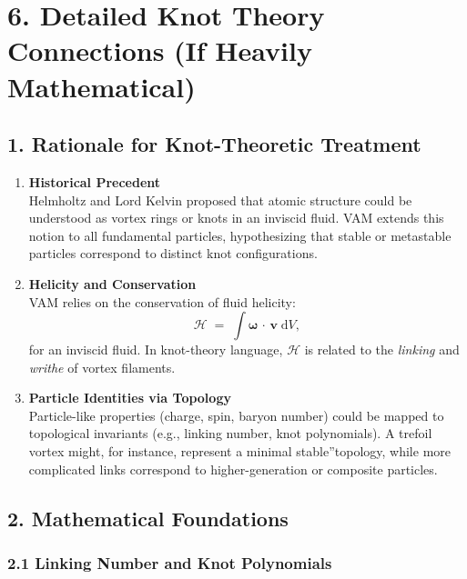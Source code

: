 

\section*{6. Detailed Knot Theory Connections (If Heavily Mathematical)}

\subsection*{1. Rationale for Knot-Theoretic Treatment}

\begin{enumerate}
    \item \textbf{Historical Precedent} \\
    Helmholtz and Lord Kelvin proposed that atomic structure could be understood as vortex rings or knots in an inviscid fluid. VAM extends this notion to all fundamental particles, hypothesizing that stable or metastable particles correspond to distinct knot configurations.
    \item \textbf{Helicity and Conservation} \\
    VAM relies on the conservation of fluid helicity:
    \[
        \mathcal{H}
        \;=\;
        \int
        \boldsymbol{\omega}\,\cdot\,\mathbf{v}\;\mathrm{d}V,
    \]
    for an inviscid fluid. In knot-theory language, \(\mathcal{H}\) is related to the \textit{linking} and \textit{writhe} of vortex filaments.
    \item \textbf{Particle Identities via Topology} \\
    Particle-like properties (charge, spin, baryon number) could be mapped to topological invariants (e.g., linking number, knot polynomials). A trefoil vortex might, for instance, represent a minimal \grqq stable\textquotedblright topology, while more complicated links correspond to higher-generation or composite particles.
\end{enumerate}

\subsection*{2. Mathematical Foundations}

\subsubsection*{2.1 Linking Number and Knot Polynomials}

